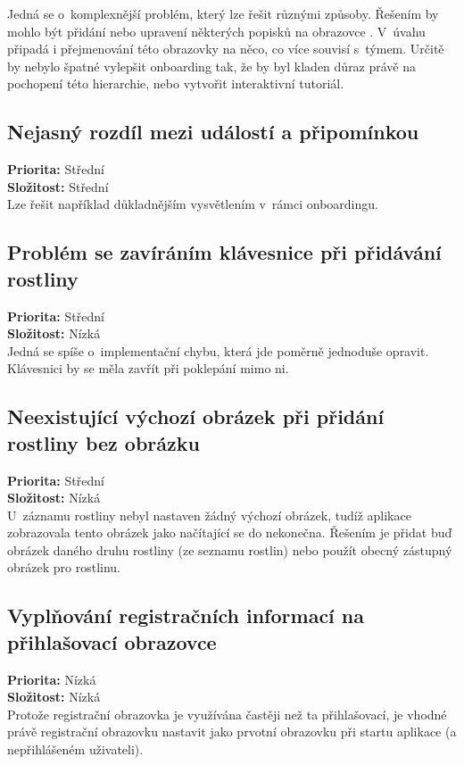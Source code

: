 \documentclass[thesis=M,czech]{FITthesis}[2019/12/23]
\begin{document}
Jedná se o~komplexnější problém, který lze řešit různými způsoby. Řešením by mohlo být přidání nebo upravení některých popisků na obrazovce . V~úvahu připadá i přejmenování této obrazovky na něco, co více souvisí s~týmem. Určitě by nebylo špatné vylepšit onboarding tak, že by byl kladen důraz právě na pochopení této hierarchie, nebo vytvořit interaktivní tutoriál.
\subsection*{Nejasný rozdíl mezi událostí a připomínkou}
\textbf{Priorita:} Střední \\
\textbf{Složitost:} Střední \\

Lze řešit například důkladnějším vysvětlením v~rámci onboardingu.
\subsection*{Problém se zavíráním klávesnice při přidávání rostliny}
\textbf{Priorita:} Střední \\
\textbf{Složitost:} Nízká \\

Jedná se spíše o~implementační chybu, která jde poměrně jednoduše opravit. Klávesnici by se měla zavřít při poklepání mimo ni.
\subsection*{Neexistující výchozí obrázek při přidání rostliny bez obrázku}
\textbf{Priorita:} Střední \\
\textbf{Složitost:} Nízká \\

U~záznamu rostliny nebyl nastaven žádný výchozí obrázek, tudíž aplikace zobrazovala tento obrázek jako načítající se do nekonečna. Řešením je přidat buď obrázek daného druhu rostliny (ze seznamu rostlin) nebo použít obecný zástupný obrázek pro rostlinu.
\subsection*{Vyplňování registračních informací na přihlašovací obrazovce}
\textbf{Priorita:} Nízká \\
\textbf{Složitost:} Nízká \\

Protože registrační obrazovka je využívána častěji než ta přihlašovací, je vhodné právě registrační obrazovku nastavit jako prvotní obrazovku při startu aplikace (a nepřihlášeném uživateli).
\end{document}

